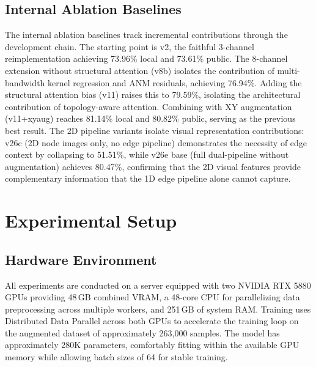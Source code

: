 \subsection{Internal Ablation Baselines}
\label{sec:internal_baselines}

The internal ablation baselines track incremental contributions through the development chain. The starting point is v2, the faithful 3-channel reimplementation achieving 73.96\% local and 73.61\% public. The 8-channel extension without structural attention (v8b) isolates the contribution of multi-bandwidth kernel regression and ANM residuals, achieving 76.94\%. Adding the structural attention bias (v11) raises this to 79.59\%, isolating the architectural contribution of topology-aware attention. Combining with XY augmentation (v11+xyaug) reaches 81.14\% local and 80.82\% public, serving as the previous best result. The 2D pipeline variants isolate visual representation contributions: v26c (2D node images only, no edge pipeline) demonstrates the necessity of edge context by collapsing to 51.51\%, while v26e base (full dual-pipeline without augmentation) achieves 80.47\%, confirming that the 2D visual features provide complementary information that the 1D edge pipeline alone cannot capture.

\section{Experimental Setup}
\label{sec:setup}

\subsection{Hardware Environment}
\label{sec:hardware}

All experiments are conducted on a server equipped with two NVIDIA RTX 5880 GPUs providing 48\,GB combined VRAM, a 48-core CPU for parallelizing data preprocessing across multiple workers, and 251\,GB of system RAM. Training uses Distributed Data Parallel across both GPUs to accelerate the training loop on the augmented dataset of approximately 263,000 samples. The model has approximately 280K parameters, comfortably fitting within the available GPU memory while allowing batch sizes of 64 for stable training.

